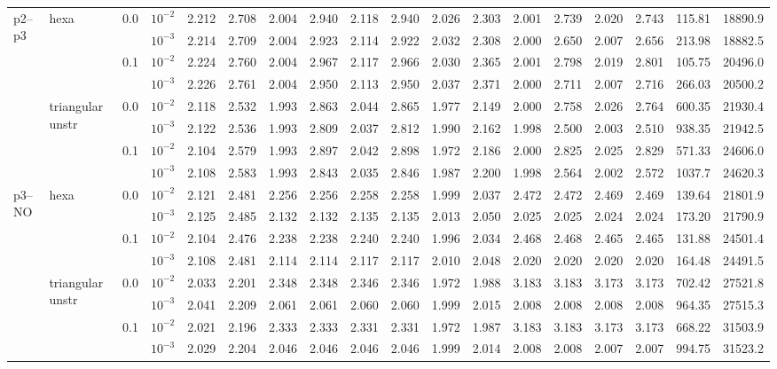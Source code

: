 \begin{longtable}{llclrrrrrrrrrrrrrr}
\multirow{8}{*}{p2--p3} & \multirow{4}{*}{hexa} & \multirow{2}{*}{0.0} & $10^{-2}$ & 2.212 & 2.708 & 2.004 & 2.940 & 2.118 & 2.940 & 2.026 & 2.303 & 2.001 & 2.739 & 2.020 & 2.743 & 115.81 & 18890.9 \\
& & & $10^{-3}$ & 2.214 & 2.709 & 2.004 & 2.923 & 2.114 & 2.922 & 2.032 & 2.308 & 2.000 & 2.650 & 2.007 & 2.656 & 213.98 & 18882.5 \\\cline{3-18}
& & \multirow{2}{*}{0.1} & $10^{-2}$ & 2.224 & 2.760 & 2.004 & 2.967 & 2.117 & 2.966 & 2.030 & 2.365 & 2.001 & 2.798 & 2.019 & 2.801 & 105.75 & 20496.0 \\
& & & $10^{-3}$ & 2.226 & 2.761 & 2.004 & 2.950 & 2.113 & 2.950 & 2.037 & 2.371 & 2.000 & 2.711 & 2.007 & 2.716 & 266.03 & 20500.2 \\\cline{2-18}
& \multirow{4}{*}{triangular unstr} & \multirow{2}{*}{0.0} & $10^{-2}$ & 2.118 & 2.532 & 1.993 & 2.863 & 2.044 & 2.865 & 1.977 & 2.149 & 2.000 & 2.758 & 2.026 & 2.764 & 600.35 & 21930.4 \\
& & & $10^{-3}$ & 2.122 & 2.536 & 1.993 & 2.809 & 2.037 & 2.812 & 1.990 & 2.162 & 1.998 & 2.500 & 2.003 & 2.510 & 938.35 & 21942.5 \\\cline{3-18}
& & \multirow{2}{*}{0.1} & $10^{-2}$ & 2.104 & 2.579 & 1.993 & 2.897 & 2.042 & 2.898 & 1.972 & 2.186 & 2.000 & 2.825 & 2.025 & 2.829 & 571.33 & 24606.0 \\
& & & $10^{-3}$ & 2.108 & 2.583 & 1.993 & 2.843 & 2.035 & 2.846 & 1.987 & 2.200 & 1.998 & 2.564 & 2.002 & 2.572 & 1037.7 & 24620.3 \\\hline

\multirow{8}{*}{p3--NO} & \multirow{4}{*}{hexa} & \multirow{2}{*}{0.0} & $10^{-2}$ & 2.121 & 2.481 & 2.256 & 2.256 & 2.258 & 2.258 & 1.999 & 2.037 & 2.472 & 2.472 & 2.469 & 2.469 & 139.64 & 21801.9 \\
& & & $10^{-3}$ & 2.125 & 2.485 & 2.132 & 2.132 & 2.135 & 2.135 & 2.013 & 2.050 & 2.025 & 2.025 & 2.024 & 2.024 & 173.20 & 21790.9 \\\cline{3-18}
& & \multirow{2}{*}{0.1} & $10^{-2}$ & 2.104 & 2.476 & 2.238 & 2.238 & 2.240 & 2.240 & 1.996 & 2.034 & 2.468 & 2.468 & 2.465 & 2.465 & 131.88 & 24501.4 \\
& & & $10^{-3}$ & 2.108 & 2.481 & 2.114 & 2.114 & 2.117 & 2.117 & 2.010 & 2.048 & 2.020 & 2.020 & 2.020 & 2.020 & 164.48 & 24491.5 \\\cline{2-18}
& \multirow{4}{*}{triangular unstr} & \multirow{2}{*}{0.0} & $10^{-2}$ & 2.033 & 2.201 & 2.348 & 2.348 & 2.346 & 2.346 & 1.972 & 1.988 & 3.183 & 3.183 & 3.173 & 3.173 & 702.42 & 27521.8 \\
& & & $10^{-3}$ & 2.041 & 2.209 & 2.061 & 2.061 & 2.060 & 2.060 & 1.999 & 2.015 & 2.008 & 2.008 & 2.008 & 2.008 & 964.35 & 27515.3 \\\cline{3-18}
& & \multirow{2}{*}{0.1} & $10^{-2}$ & 2.021 & 2.196 & 2.333 & 2.333 & 2.331 & 2.331 & 1.972 & 1.987 & 3.183 & 3.183 & 3.173 & 3.173 & 668.22 & 31503.9 \\
& & & $10^{-3}$ & 2.029 & 2.204 & 2.046 & 2.046 & 2.046 & 2.046 & 1.999 & 2.014 & 2.008 & 2.008 & 2.007 & 2.007 & 994.75 & 31523.2 \\\hline


\end{longtable}
